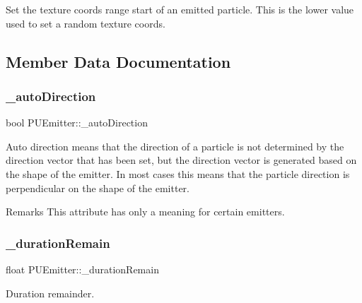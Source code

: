 Set the texture coords range start of an emitted particle. This is the lower value used to set a random texture coords. 

\subsection{Member Data Documentation}
\mbox{\label{classPUEmitter_a9d726a310ce20bd3e5bc504b5d81e9f6}} 
\subsubsection{\texorpdfstring{\+\_\+auto\+Direction}{\_autoDirection}}
{\footnotesize\ttfamily bool P\+U\+Emitter\+::\+\_\+auto\+Direction\hspace{0.3cm}{\ttfamily [protected]}}

Auto direction means that the direction of a particle is not determined by the direction vector that has been set, but the direction vector is generated based on the shape of the emitter. In most cases this means that the particle direction is perpendicular on the shape of the emitter. \begin{DoxyRemark}{Remarks}
This attribute has only a meaning for certain emitters. 
\end{DoxyRemark}
\mbox{\label{classPUEmitter_a61b7ec1702a2818f66086486c80a7def}} 
\subsubsection{\texorpdfstring{\+\_\+duration\+Remain}{\_durationRemain}}
{\footnotesize\ttfamily float P\+U\+Emitter\+::\+\_\+duration\+Remain\hspace{0.3cm}{\ttfamily [protected]}}

Duration remainder. \mbox{\label{classPUEmitter_a2bdf89257051384903ae1a4a783c9bb7}} 
